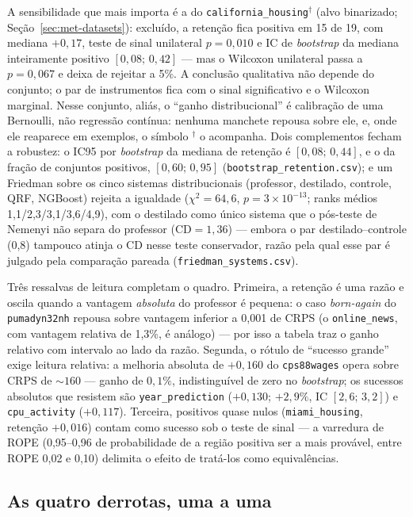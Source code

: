 A sensibilidade que mais importa é a do
\texttt{california\_housing}$^\dagger$ (alvo binarizado;
Seção~\ref{sec:met-datasets}): excluído, a retenção fica positiva em
15 de 19, com mediana $+0{,}17$, teste de sinal unilateral
$p=0{,}010$ e IC de
\emph{bootstrap} da mediana inteiramente positivo $[0{,}08;\,0{,}42]$
--- mas o Wilcoxon unilateral passa a $p=0{,}067$ e deixa de rejeitar
a 5\%. A conclusão qualitativa não depende do conjunto; o par de
instrumentos fica com o sinal significativo e o Wilcoxon marginal.
Nesse conjunto, aliás, o ``ganho distribucional'' é calibração de uma
Bernoulli, não regressão contínua: nenhuma manchete repousa sobre ele,
e, onde ele reaparece em exemplos, o símbolo $^\dagger$ o acompanha.
Dois complementos fecham a robustez: o IC95 por \emph{bootstrap} da
mediana de retenção é $[0{,}08;\,0{,}44]$, e o da fração de conjuntos
positivos, $[0{,}60;\,0{,}95]$
(\texttt{bootstrap\_\allowbreak retention.csv}); e um Friedman sobre
os cinco sistemas distribucionais (professor, destilado, controle,
QRF, NGBoost) rejeita a igualdade ($\chi^2{=}64{,}6$,
$p{=}3{\times}10^{-13}$; ranks médios 1,1/2,3/3,1/3,6/4,9), com o
destilado como único sistema que o pós-teste de Nemenyi não separa do
professor ($\mathrm{CD}{=}1{,}36$) --- embora o par
destilado--controle (0,8) tampouco atinja o CD nesse teste
conservador, razão pela qual esse par é julgado pela comparação
pareada (\texttt{friedman\_\allowbreak systems.csv}).

Três ressalvas de leitura completam o quadro. Primeira, a retenção é
uma razão e oscila quando a vantagem \emph{absoluta} do professor é
pequena: o caso
\emph{born-again} do \texttt{pumadyn32nh} repousa sobre vantagem
inferior a 0,001 de CRPS (o \texttt{online\_news}, com vantagem
relativa de 1,3\%, é análogo) --- por isso a
tabela traz o ganho relativo com intervalo ao lado da razão. Segunda,
o rótulo de ``sucesso grande'' exige leitura relativa: a melhoria
absoluta de $+0{,}160$ do \texttt{cps88wages} opera sobre CRPS de
${\sim}160$ --- ganho de $0{,}1\%$, indistinguível de zero no
\emph{bootstrap}; os sucessos absolutos que resistem são
\texttt{year\_\allowbreak prediction} ($+0{,}130$; $+2{,}9\%$, IC
$[2{,}6;\,3{,}2]$) e \texttt{cpu\_activity} ($+0{,}117$). Terceira,
positivos quase nulos (\texttt{miami\_housing}, retenção
$+0{,}016$) contam
como sucesso sob o teste de sinal --- a varredura de ROPE
(0,95--0,96 de probabilidade de a região positiva ser a mais
provável, entre ROPE 0,02 e 0,10)
delimita o efeito de tratá-los como equivalências.

\subsection{As quatro derrotas, uma a uma}
\label{sec:destil-derrotas}

